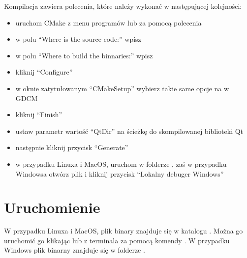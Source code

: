 Kompilacja zawiera polecenia, które należy wykonać w następującej kolejności:
\begin{itemize}
    \item uruchom CMake z menu programów lub za pomocą polecenia 
    \item w polu \enquote{Where is the source code:} wpisz 
    \item w polu \enquote{Where to build the binnaries:} wpisz 
    \item kliknij \enquote{Configure}
    \item w oknie zatytułowanym \enquote{CMakeSetup} wybierz takie same opcje na w GDCM
    \item kliknij \enquote{Finish}
    \item ustaw parametr wartość \enquote{QtDir} na ścieżkę do skompilowanej biblioteki Qt
    \item następnie kliknij przycisk \enquote{Generate}
    \item w przypadku Linuxa i MacOS, uruchom  w folderze , zaś w przypadku Windowsa otwórz plik  i kliknij przycisk \enquote{Lokalny debuger Windows}
\end{itemize}

\section{Uruchomienie}

W przypadku Linuxa i MacOS, plik binary znajduje się w katalogu .
Można go uruchomić go klikając lub z terminala za pomocą komendy .
W przypadku Windows plik binarny znajduje się w folderze .